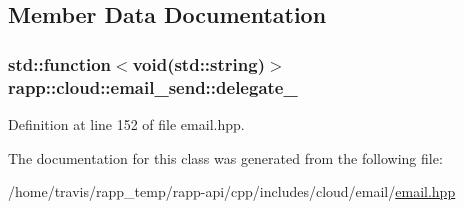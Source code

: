 \subsection{Member Data Documentation}
\hypertarget{classrapp_1_1cloud_1_1email__send_a8411459df7614fa390cfa8351277ec4c}{
\subsubsection[{delegate\-\_\-}]{\setlength{\rightskip}{0pt plus 5cm}std\-::function$<$void(std\-::string)$>$ rapp\-::cloud\-::email\-\_\-send\-::delegate\-\_\-\hspace{0.3cm}{\ttfamily [private]}}}\label{classrapp_1_1cloud_1_1email__send_a8411459df7614fa390cfa8351277ec4c}


Definition at line 152 of file email.\-hpp.



The documentation for this class was generated from the following file\-:\begin{DoxyCompactItemize}
\item 
/home/travis/rapp\-\_\-temp/rapp-\/api/cpp/includes/cloud/email/\hyperlink{email_8hpp}{email.\-hpp}\end{DoxyCompactItemize}
